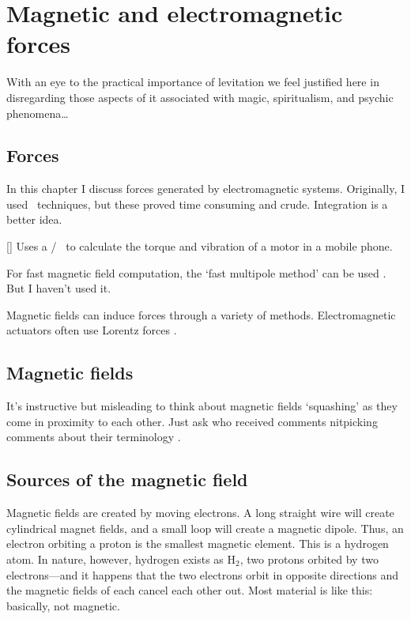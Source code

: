 \chapter{Magnetic and electromagnetic forces}

\epigraph{With an eye to the practical importance of levitation we
feel justified here in disregarding those aspects of it
associated with magic, spiritualism, and psychic
phenomena\dots}{\textcite{boerdijk1956b}}



\section{Forces}

In this chapter I discuss forces generated by electromagnetic
systems. Originally, I used \FEA\ techniques, but these proved time
consuming and crude. Integration is a better idea.

[\textcite{won2005}] Uses a \twoD/ \FEM\ to calculate the torque and
vibration of a motor in a mobile phone.

For fast magnetic field computation, the `fast multipole method' can
be used \cite{adedoyin2007}. But I haven't used it.

Magnetic fields can induce forces through a variety of
methods. Electromagnetic actuators often use Lorentz forces
\cite{hollis1993}.

\section{Magnetic fields}

It's instructive but misleading to think about magnetic fields
`squashing' as they come in proximity to each other. Just ask
\textcite{sodano2006} who received comments nitpicking comments about
their terminology \cite{marneffe2007}.

\section{Sources of the magnetic field}

Magnetic fields are created by moving electrons. A long straight wire
will create cylindrical magnet fields, and a small loop will create a
magnetic dipole. Thus, an electron orbiting a proton is the smallest
magnetic element.  This is a hydrogen atom. In nature, however,
hydrogen exists as H$_2$, two protons orbited by two electrons---and
it happens that the two electrons orbit in opposite directions and the
magnetic fields of each cancel each other out.  Most material is like
this: basically, not magnetic.


